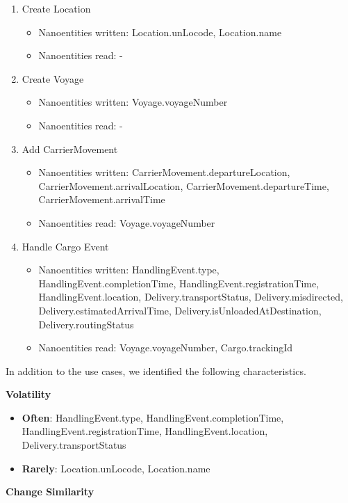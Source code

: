 \begin{enumerate}
	\item Create Location
	\begin{itemize}
		\item Nanoentities written: Location.unLocode, Location.name
		\item Nanoentities read: -
	\end{itemize}

	\item Create Voyage
	\begin{itemize}
		\item Nanoentities written: Voyage.voyageNumber
		\item Nanoentities read: -
	\end{itemize}
	
	\item Add CarrierMovement
	\begin{itemize}
		\item Nanoentities written: CarrierMovement.departureLocation, CarrierMovement.arrivalLocation, CarrierMovement.departureTime, CarrierMovement.arrivalTime
		\item Nanoentities read: Voyage.voyageNumber
	\end{itemize}
	
	\item Handle Cargo Event
	\begin{itemize}
		\item Nanoentities written: HandlingEvent.type, HandlingEvent.completionTime, HandlingEvent.registrationTime, HandlingEvent.location, Delivery.transportStatus, Delivery.misdirected, Delivery.estimatedArrivalTime, Delivery.isUnloadedAtDestination, Delivery.routingStatus
		\item Nanoentities read: Voyage.voyageNumber, Cargo.trackingId
	\end{itemize}
\end{enumerate}

In addition to the use cases, we identified the following characteristics.

\textbf{Volatility}

\begin{itemize}
	\item \textbf{Often}: HandlingEvent.type, HandlingEvent.completionTime, HandlingEvent.registrationTime, HandlingEvent.location, Delivery.transportStatus 
	\item \textbf{Rarely}: Location.unLocode, Location.name
\end{itemize} 

\textbf{Change Similarity}

